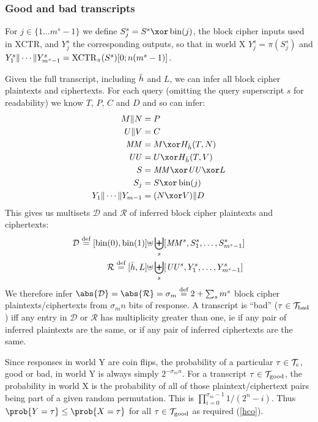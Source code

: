 \documentclass[hctr2.tex]{subfiles}
\begin{document}
\subsubsection{Good and bad transcripts}
For \(j \in \{1 \ldots m^s-1\}\) we define \(S_j^s = S^s \xor \fromint(j)\),
the block cipher inputs used in XCTR, and \(Y_j^s\) the corresponding
outputs, so that in world X \(Y_j^s = \pi(S_j^s)\) and 
\(Y_1^s \Vert \cdots \Vert Y_{m^s-1}^s = \operatorname{XCTR}_\pi(S^s)[0;n(m^s -1)]\).

Given the full transcript, including \(\bar{h}\) and \(L\),
we can infer all block cipher plaintexts and ciphertexts.
For each query
(omitting the query superscript \(s\) for readability)
we know \(T\), \(P\), \(C\) and \(D\) and so can infer:
\begin{align*}
    M \Concat N &= P \\
    U \Concat V &= C \\
    \MM &= M \xor H_{\hgen}(T, N)\\
    \UU &= U \xor H_{\hgen}(T, V)\\
    S &= \MM \xor \UU \xor L\\ 
    S_j &= S \xor \fromint(j)\\
    Y_1 \Concat \cdots \Concat Y_{m-1} &= (N \xor V) \Concat D
\end{align*}
This gives us multisets \(\mathcal{D}\) and \(\mathcal{R}\)
of inferred block cipher plaintexts and ciphertexts:
\begin{align*}
    \mathcal{D} \stackrel{\text{def}}{=} [\operatorname{bin}(0), \operatorname{bin}(1)] \uplus &
    \biguplus_s [\mathit{MM}^s, S_1^s, \ldots, S_{m^s-1}^s]\\
    \mathcal{R} \stackrel{\text{def}}{=} [\bar{h}, L] \uplus &
    \biguplus_s [\mathit{UU}^s, Y_1^s, \ldots, Y_{m^s-1}^s]
\end{align*}
We therefore infer
\(\abs{\mathcal{D}} = \abs{\mathcal{R}} = \sigma_m \defeq 2 + \sum_s m^s\)
block cipher plaintexts/ciphertexts
from \(\sigma_m n\) bits of response.
A transcript is ``bad'' (\(\tau \in \mathcal{T}_\mathrm{bad}\))
iff any entry in \(\mathcal{D}\) or \(\mathcal{R}\)
has multiplicity greater than one,
ie if any pair of inferred plaintexts are the same, or
if any pair of inferred ciphertexts are the same.

Since responses in world Y are coin flips,
the probability of a 
particular \(\tau \in \mathcal{T}_\mathrm{c}\), good or bad,
in world Y is always simply \(2^{-\sigma_m n}\).
For a transcript \(\tau \in \mathcal{T}_\mathrm{good}\),
the probability in world X
is the probability of all of those plaintext/ciphertext
pairs being part of a given random permutation.
This is 
\(\prod_{i=0}^{\sigma_m -1}1/(2^n - i)\).
Thus \(\prob{Y = \tau} \leq \prob{X = \tau}\)
for all \(\tau \in \mathcal{T}_\mathrm{good}\) as required (\autoref{hco}).
\end{document}
